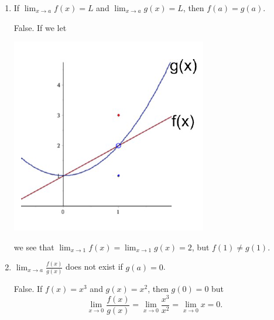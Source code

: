 \documentclass[nooutcomes]{ximera}
\begin{document}
\begin{problem}
\begin{enumerate}
			\item  If $ \lim_{x \to a} f(x) = L $ and $  \lim_{x \to a} g(x) = L $, then $f(a) = g(a)$.
			\begin{freeResponse}
			 False.  If we let 
			 
			 	\begin{image}
			       \includegraphics{Figure3}
			 	\end{image}
				
			 we see that $ \lim_{x \to 1} f(x) = \lim_{x \to 1} g(x) = 2$, but $f(1) \ne g(1)$.
			\end{freeResponse}
			
			\item  $ \lim_{x \to a} \frac{f(x)}{g(x)} $ does not exist if $g(a) = 0$.
			\begin{freeResponse}
			False.  If $f(x) = x^3$ and $g(x) = x^2$, then $g(0) = 0$ but 
			$$ \lim_{x \to 0} \frac{f(x)}{g(x)} = \lim_{x \to 0} \frac{x^3}{x^2} = \lim_{x \to 0} x = 0.$$
			\end{freeResponse}
			
			
			
			\end{enumerate}
\end{problem}
	
\end{document}
